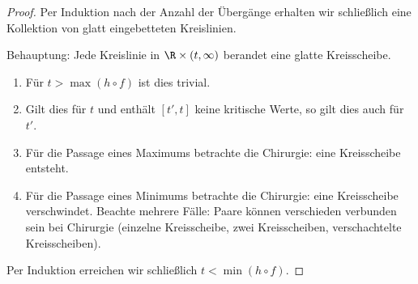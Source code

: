 \begin{st}
\begin{proof}
        Per Induktion nach der Anzahl der Übergänge erhalten wir schließlich eine Kollektion von glatt eingebetteten Kreislinien.

        Behauptung: Jede Kreislinie in $\R \times (t,\infty)$ berandet eine glatte Kreisscheibe.
        \begin{enumerate}[1),start=0]
            \item
                Für $t > \max(h \circ f)$ ist dies trivial.
            \item
                Gilt dies für $t$ und enthält $[t', t]$ keine kritische Werte, so gilt dies auch für $t'$.
            \item
                Für die Passage eines Maximums betrachte die Chirurgie: eine Kreisscheibe entsteht.
            \item
                Für die Passage eines Minimums betrachte die Chirurgie: eine Kreisscheibe verschwindet.
                Beachte mehrere Fälle: Paare können verschieden verbunden sein bei Chirurgie (einzelne Kreisscheibe, zwei Kreisscheiben, verschachtelte Kreisscheiben).
        \end{enumerate}
        Per Induktion erreichen wir schließlich $t < \min(h \circ f)$.
    \end{proof}
\end{st}

